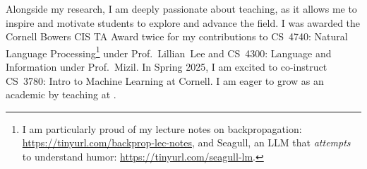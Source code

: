 
Alongside my research, I am deeply passionate about teaching, as it allows me to inspire and motivate students to explore and advance the field.
%
I was awarded the Cornell Bowers CIS TA Award twice for my contributions to CS~4740: Natural Language Processing\footnote{I am particularly proud of my lecture notes on backpropagation: \url{https://tinyurl.com/backprop-lec-notes}, and Seagull, an LLM that \textit{attempts} to understand humor: \url{https://tinyurl.com/seagull-lm}.} under Prof.~Lillian~Lee and CS~4300: Language and Information under Prof.~Mizil. 
%
In Spring 2025, I am excited to co-instruct CS~3780: Intro to Machine Learning at Cornell.
%
I am eager to grow as an academic by teaching at \thecollegeabbr.
